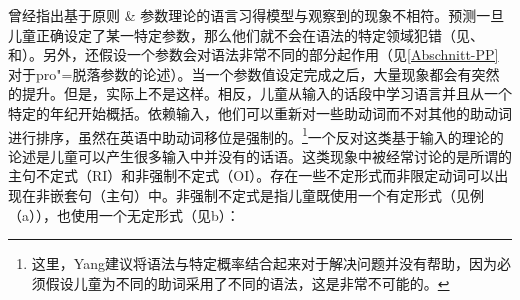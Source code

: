  \citet{Tomasello2000a,Tomasello2003a}曾经指出基于原则 \& 参数理论的语言习得模型与观察到的现象不相符。\pptc 预测一旦儿童正确设定了某一特定参数，那么他们就不会在语法的特定领域犯错（见\citealp[]{Chomsky86}、\citealp[--22]{Radford90a-u}和\citealp[]{Lightfoot97a}）。另外，还假设一个参数会对语法非常不同的部分起作用（见\ref{Abschnitt-PP}对于pro"=脱落参数的论述）。当一个参数值设定完成之后，大量现象都会有突然的提升\citep[]{Lightfoot97a}。但是，实际上不是这样。相反，儿童从输入的话段中学习语言并且从一个特定的年纪开始概括。依赖输入，他们可以重新对一些助动词而不对其他的助动词进行排序，虽然在英语中助动词移位是强制的。\footnote{%
这里，Yang建议将语法与特定概率结合起来对于解决问题并没有帮助，因为必须假设儿童为不同的助词采用了不同的语法，这是非常不可能的。
}一个反对这类基于输入的理论的论述是儿童可以产生很多输入中并没有的话语。这类现象中被经常讨论的是所谓的主句不定式（RI）和非强制不定式（OI）\citep{Wexler98a}。存在一些不定形式而非限定动词可以出现在非嵌套句（主句）中。非强制不定式是指儿童既使用一个有定形式（见例 （a）），也使用一个无定形式（见b）\citep[]{Wexler98a}：
